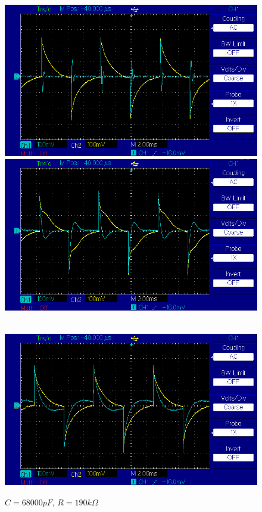 \documentclass{article}
\begin{document}
\begin{figure}[!h]
        \centering
        \includegraphics[width=\linewidth]{figures/results/resistor_190_Ohm/c3300pF.png}
        \caption{$C = 3300 pF$, $R = 190 k\Omega$}
        \label{img:c33e2_r190}
    \endminipage\hfill
        \centering
        \includegraphics[width=\linewidth]{figures/results/resistor_190_Ohm/c6800pF.png}
        \caption{$C = 6800 pF$, $R = 190 k\Omega$}
        \label{img:c68e2_r190}
    \endminipage\hfill \\
        \centering
        \includegraphics[width=\linewidth]{figures/results/resistor_190_Ohm/c68000pF.png}
        \caption{$C = 68000 pF$, $R = 190 k\Omega$}
        \label{img:c68e3_r190}
    \endminipage\hfill
\end{figure}
\end{document}
